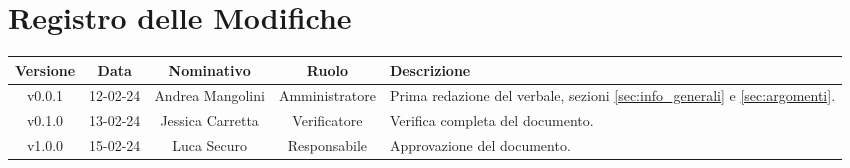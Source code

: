 \section*{\Large Registro delle Modifiche}
    \begin{table}[h]
        \centering
        \renewcommand\tabularxcolumn[1]{m{#1}} %
        \renewcommand{\arraystretch}{1.5}
        \begin{tabularx}{0.98\textwidth}
            {c|c|c|c|>{\centering\arraybackslash}X}
            \rowcolor{black}
            \textbf{\color{white} Versione} & \textbf{\color{white} Data} & \textbf{\color{white} Nominativo} & \textbf{\color{white} Ruolo} & \textbf{\color{white} Descrizione} \\ 
            \hline

            v0.0.1 & 12-02-24 & Andrea Mangolini & Amministratore & Prima redazione del verbale, sezioni \ref{sec:info_generali} e \ref{sec:argomenti}. \\
            v0.1.0 & 13-02-24 & Jessica Carretta & Verificatore & Verifica completa del documento. \\
            v1.0.0 & 15-02-24 & Luca Securo & Responsabile & Approvazione del documento. \\
            \hline
        \end{tabularx}
    \end{table}